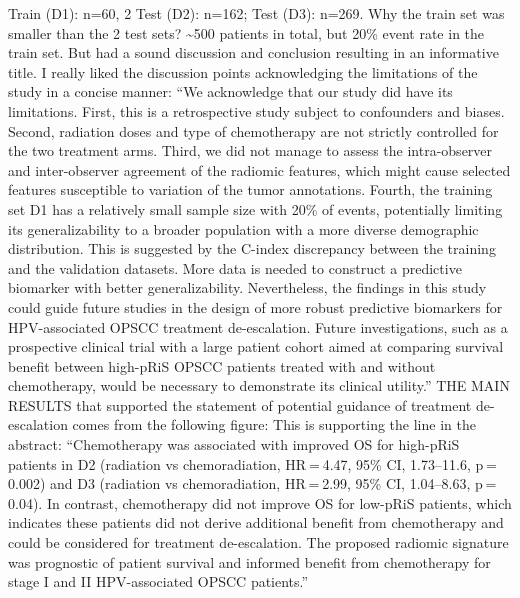 \documentclass{article}%
\begin{document}
%
Train (D1): n=60, 2 Test (D2): n=162; Test (D3): n=269. Why the train set was smaller than the 2 test sets? %
\newline%
\newline%
%
\textasciitilde{}500 patients in total, but 20\% event rate in the train set. But had a sound discussion and conclusion resulting in an informative title. %
\newline%
\newline%
%
I really liked the discussion points acknowledging the limitations of the study in a concise manner: “We acknowledge that our study did have its limitations. First, this is a retrospective study subject to confounders and biases. Second, radiation doses and type of chemotherapy are not strictly controlled for the two treatment arms. Third, we did not manage to assess the intra{-}observer and inter{-}observer agreement of the radiomic features, which might cause selected features susceptible to variation of the tumor annotations. Fourth, the training set D1 has a relatively small sample size with 20\% of events, potentially limiting its generalizability to a broader population with a more diverse demographic distribution. This is suggested by the C{-}index discrepancy between the training and the validation datasets. More data is needed to construct a predictive biomarker with better generalizability. Nevertheless, the findings in this study could guide future studies in the design of more robust predictive biomarkers for HPV{-}associated OPSCC treatment de{-}escalation. Future investigations, such as a prospective clinical trial with a large patient cohort aimed at comparing survival benefit between high{-}pRiS OPSCC patients treated with and without chemotherapy, would be necessary to demonstrate its clinical utility.”%
\newline%
\newline%
%
THE MAIN RESULTS that supported the statement of potential guidance of treatment de{-}escalation comes from the following figure: %
\newline%
\newline%
%
%
\newline%
\newline%
%
This is supporting the line in the abstract: “Chemotherapy was associated with improved OS for high{-}pRiS patients in D2 (radiation vs chemoradiation, HR = 4.47, 95\% CI, 1.73–11.6, p = 0.002) and D3 (radiation vs chemoradiation, HR = 2.99, 95\% CI, 1.04–8.63, p = 0.04). In contrast, chemotherapy did not improve OS for low{-}pRiS patients, which indicates these patients did not derive additional benefit from chemotherapy and could be considered for treatment de{-}escalation. The proposed radiomic signature was prognostic of patient survival and informed benefit from chemotherapy for stage I and II HPV{-}associated OPSCC patients.”%
\end{document}
